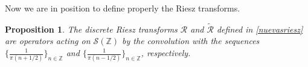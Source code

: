 \documentclass[11pt]{amsart}
\numberwithin{equation}{section}
\newcommand{\Z}{\mathbb{Z}}
\newcommand{\T}{\mathbb{T}}
\theoremstyle{plain}
\newtheorem{prop}{Proposition}
\theoremstyle{remark}
\begin{document}

Now we are in position to define properly the Riesz transforms.

\begin{prop}
\label{prop:Riesz-SZ}
The discrete Riesz transforms $\mathcal{R}$ and $\widetilde{\mathcal{R}}$ defined in \eqref{nuevasriesz} are operators acting on $\mathcal{S}(\Z)$ by the convolution with the sequences $\big \{ \frac1{\pi(n+1/2)}\big \}_{n\in \Z}$ and $\big \{ \frac1{\pi(n-1/2)} \big \}_{n\in\Z}$, respectively.
\end{prop}
\end{document}
